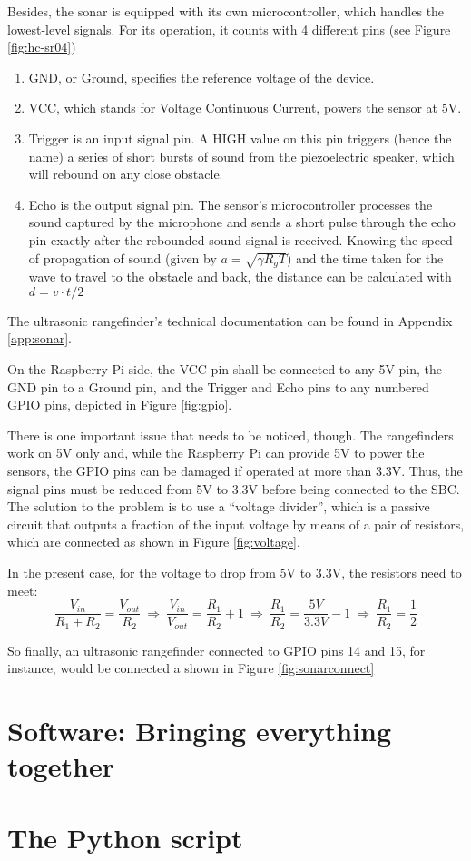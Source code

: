 Besides, the sonar is equipped with its own microcontroller, which handles the lowest-level signals.
For its operation, it counts with 4 different pins (see Figure \ref{fig:hc-sr04}) 
\begin{enumerate}
	\item GND, or Ground, specifies the reference voltage of the device.
	\item VCC, which stands for Voltage Continuous Current, powers the sensor at 5V.
	\item Trigger is an input signal pin.
		A HIGH value on this pin triggers (hence the name) a series of short bursts of sound from the piezoelectric speaker, which will rebound on any close obstacle.
	\item Echo is the output signal pin.
		The sensor's microcontroller processes the sound captured by the microphone and sends a short pulse through the echo pin exactly after the rebounded sound signal is received.
		Knowing the speed of propagation of sound (given by $a=\sqrt{\gamma R_g T}$) and the time taken for the wave to travel to the obstacle and back, the distance can be calculated with $d=v \cdot t/2$
\end{enumerate}
The ultrasonic rangefinder's technical documentation can be found in Appendix \ref{app:sonar}.

On the Raspberry Pi side, the VCC pin shall be connected to any 5V pin, the GND pin to a Ground pin, and the Trigger and Echo pins to any numbered GPIO pins, depicted in Figure \ref{fig:gpio}.



There is one important issue that needs to be noticed, though.
The rangefinders work on 5V only and, while the Raspberry Pi can provide 5V to power the sensors, the GPIO pins can be damaged if operated at more than 3.3V.
Thus, the signal pins must be reduced from 5V to 3.3V before being connected to the SBC.
The solution to the problem is to use a ``voltage divider'', which is a passive circuit that outputs a fraction of the input voltage by means of a pair of resistors, which are connected as shown in Figure \ref{fig:voltage}.



In the present case, for the voltage to drop from 5V to 3.3V, the resistors need to meet:
\begin{equation}
	\frac{V_{in}}{R_1+R_2}=\frac{V_{out}}{R_2} \ \Rightarrow\ \frac{V_{in}}{V_{out}}=\frac{R_1}{R_2}+1 \ \Rightarrow\ \frac{R_1}{R_2}=\frac{5V}{3.3V}-1 \ \Rightarrow\ \frac{R_1}{R_2}=\frac{1}{2} 
\end{equation}

So finally, an ultrasonic rangefinder connected to GPIO pins 14 and 15, for instance, would be connected a shown in Figure \ref{fig:sonarconnect}




\section{Software: Bringing everything together}


\section{The Python script}




